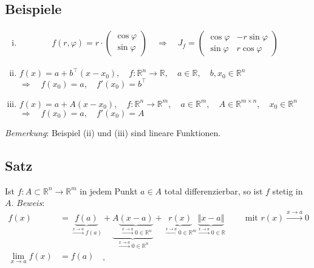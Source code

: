 \documentclass[11pt,a4paper]{book}
\newcommand {\R}	{\mathbb{R}}
\newcommand {\Rn}	{\mathbb{R}^n}
\newcommand {\Rm}	{\mathbb{R}^m}
\newcommand {\Rmxn}	{\mathbb{R}^{m \times n}}
\newcommand{\1}    	{\mathbbm{1}}
\newcommand{\mitt}	{\textrm{ mit }}
\begin{document}
\subsection{Beispiele}
\begin{enumerate}[(i)]
	\item \begin{align*}
		f(r,\varphi) = r \cdot \left( \begin{array}{c} \cos \varphi \\ \sin \varphi \end{array} \right) \quad \Rightarrow \quad J_f = \left( \begin{array}{cc}
			\cos \varphi & -r \sin \varphi \\
			\sin \varphi & r \cos \varphi
		\end{array} \right)
	\end{align*}
	\item \(f(x) = a + b^\top(x - x_0), \quad f : \Rn \rightarrow \R, \quad a \in \R, \quad b,x_0 \in \Rn\) \\
	\(\Rightarrow \quad f(x_0) = a, \quad f'(x_0) = b^\top \)
	\item \(f(x) = a + A(x - x_0), \quad f : \Rn \rightarrow \Rm, \quad a \in \Rm, \quad A \in \Rmxn, \quad x_0 \in \Rn\) \\
	\(\Rightarrow \quad f(x_0) = a, \quad f'(x_0) = A \)
\end{enumerate}
\textit{Bemerkung}: Beispiel (ii) und (iii) sind lineare Funktionen.

\subsection{Satz}
Ist \(f : A \subset \Rn \rightarrow \Rm\) in jedem Punkt \(a \in A\) total differenzierbar, so ist \(f\) stetig in \(A\).
\textit{Beweis}:
\begin{align*}
	f(x) &= \underbrace{f(a)}_{\stackrel{x \rightarrow a}{\rightarrow} f(a)} + 
	\underbrace{A \underbrace{(x-a)}_{\stackrel{x \rightarrow a}{\rightarrow} 0 \in \Rn}}_{\stackrel{x \rightarrow a}{\rightarrow} 0 \in \Rn} + 
	\underbrace{r(x)}_{\stackrel{x \rightarrow a}{\rightarrow} 0 \in \Rm} 
	\underbrace{\Vert x - a \Vert}_{\stackrel{x \rightarrow a}{\rightarrow} 0 \in \R}
	\qquad \mitt r(x) \stackrel{x \rightarrow a}{\rightarrow} 0 \\
	\lim_{x \rightarrow a} f(x) &= f(a) \quad _\square\\
\end{align*}
\end{document}
